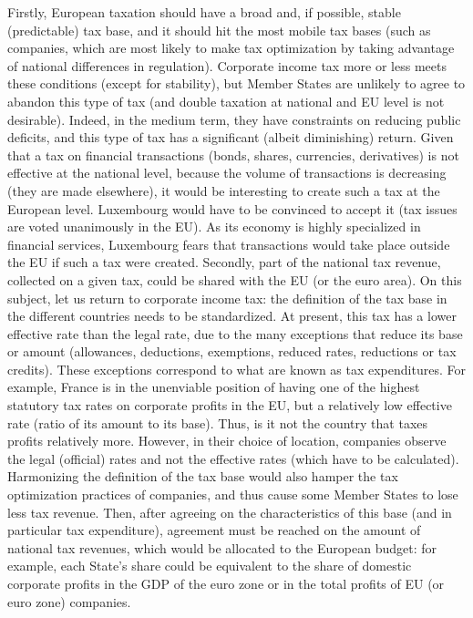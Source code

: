 \documentclass[12pt]{article}
\begin{document}
Firstly, European taxation should have a broad and, if possible, stable (predictable) tax base, and it should hit the most mobile tax bases (such as companies, which are most likely to make tax optimization by taking advantage of national differences in regulation). Corporate income tax more or less meets these conditions (except for stability), but Member States are unlikely to agree to abandon this type of tax (and double taxation at national and EU level is not desirable). Indeed, in the medium term, they have constraints on reducing public deficits, and this type of tax has a significant (albeit diminishing) return. Given that a tax on financial transactions (bonds, shares, currencies, derivatives) is not effective at the national level, because the volume of transactions is decreasing (they are made elsewhere), it would be interesting to create such a tax at the European level. Luxembourg would have to be convinced to accept it (tax issues are voted unanimously in the EU). As its economy is highly specialized in financial services, Luxembourg fears that transactions would take place outside the EU if such a tax were created.
Secondly, part of the national tax revenue, collected on a given tax, could be shared with the EU (or the euro area). On this subject, let us return to corporate income tax: the definition of the tax base in the different countries needs to be standardized. At present, this tax has a lower effective rate than the legal rate, due to the many exceptions that reduce its base or amount (allowances, deductions, exemptions, reduced rates, reductions or tax credits). These exceptions correspond to what are known as tax expenditures. For example, France is in the unenviable position of having one of the highest statutory tax rates on corporate profits in the EU, but a relatively low effective rate (ratio of its amount to its base). Thus, is it not the country that taxes profits relatively more. However, in their choice of location, companies observe the legal (official) rates and not the effective rates (which have to be calculated). Harmonizing the definition of the tax base would also hamper the tax optimization practices of companies, and thus cause some Member States to lose less tax revenue. Then, after agreeing on the characteristics of this base (and in particular tax expenditure), agreement must be reached on the amount of national tax revenues, which would be allocated to the European budget: for example, each State's share could be equivalent to the share of domestic corporate profits in the GDP of the euro zone or in the total profits of EU (or euro zone) companies.
\end{document}
